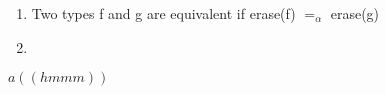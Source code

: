 \documentclass[onecolumn,11pt]{article}
\begin{document}
\begin{enumerate}
\item Two types f and g are equivalent if erase(f) $=_{\alpha}$ erase(g)

\item

\end{enumerate}

$a\left( \left( hmmm \right) \right)$
\end{document}
